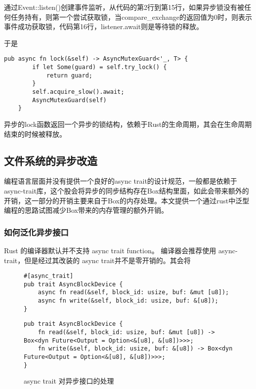 通过Event::listen()创建事件监听，从代码的第2行到第15行，如果异步锁没有被任何任务持有，则第一个尝试获取锁，当compare\_exchange的返回值为0时，则表示事件成功获取锁，代码第16行，listener.await则是等待锁的释放。 

于是  
\begin{lstlisting}[caption = 异步锁]
pub async fn lock(&self) -> AsyncMutexGuard<'_, T> {
        if let Some(guard) = self.try_lock() {
            return guard;
        }
        self.acquire_slow().await;
        AsyncMutexGuard(self)
    }
\end{lstlisting}

异步的lock函数返回一个异步的锁结构，依赖于Rust的生命周期，其会在生命周期结束的时候被释放。


\subsection{文件系统的异步改造}

编程语言层面并没有提供一个良好的async trait的设计规范，一般都是依赖于async-trait库，这个股会将异步的同步结构存在Box结构里面，如此会带来额外的开销，这一部分的开销主要来自于Box的内存处理。本文提供一个通过rust中泛型编程的思路试图减少Box带来的内存管理的额外开销。

\subsubsection*{如何泛化异步接口}

Rust 的编译器默认并不支持 async trait function。 编译器会推荐使用 async-trait，但是经过其改装的 async trait并不是零开销的。其会将


\begin{figure}[htbp]
    \figureCapSet
	\centering
	\begin{minipage}{0.49\linewidth}%
		\centering
        \begin{lstlisting}[frame=none]
#[async_trait]
pub trait AsyncBlockDevice {
    async fn read(&self, block_id: usize, buf: &mut [u8]);
    async fn write(&self, block_id: usize, buf: &[u8]);
}
        \end{lstlisting}
	\end{minipage}
    \hfill
	\begin{minipage}{0.49\linewidth}
		\centering
        \begin{lstlisting}[frame=none]
pub trait AsyncBlockDevice {
    fn read(&self, block_id: usize, buf: &mut [u8]) -> Box<dyn Future<Output = Option<&[u8], &[u8])>>>;
    fn write(&self, block_id: usize, buf: &[u8]) -> Box<dyn Future<Output = Option<&[u8], &[u8])>>>;
}
        \end{lstlisting}
	\end{minipage}
    \caption{async trait 对异步接口的处理}
\end{figure}


